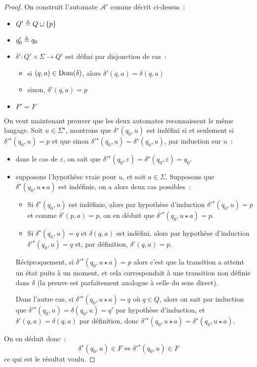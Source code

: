 \begin{proof}
  On construit l'automate $\mathcal A'$ comme décrit ci-dessus~:
  \begin{itemize}
  \item $Q' \triangleq Q \sqcup \{p\}$
  \item $q'_0 \triangleq q_0$
  \item $\delta' : Q' \times \Sigma \to Q'$ est défini par disjonction de cas~:
    \begin{itemize}
    \item si $(q,a) \in \operatorname{Dom}(\delta)$, alors $\delta'(q,a) = \delta(q,a)$
    \item sinon, $\delta'(q,a) = p$
    \end{itemize}
  \item $F' = F$
  \end{itemize}

  On veut maintenant prouver que les deux automates reconnaissent le même
  langage. Soit $u \in \Sigma^\star$, montrons que $\delta^\star(q_0,u)$ est
  indéfini si et seulement si $\delta'^\star(q_0,u) = p$ et que sinon
  $\delta'^\star(q_0,u) = \delta^\star(q_0,u)$, par induction sur $u$~:
  \begin{itemize}
  \item dans le cas de $\varepsilon$, on sait que
    $\delta'^\star(q_0,\varepsilon) = \delta^\star(q_0,\varepsilon) = q_0$.
  \item supposons l'hypothèse vraie pour $u$, et soit $a \in \Sigma$. Supposons
    que $\delta^\star(q_0,u\star a)$ est indéfinie, on a alors deux cas
    possibles~:
    \begin{itemize}
    \item Si $\delta^\star(q_0,u)$ est indéfinie, alors par hypothèse
      d'induction $\delta'^\star(q_0,u) = p$ et comme $\delta'(p,a) = p$, on en
      déduit que $\delta'^\star(q_0,u\star a) = p$.
    \item Si $\delta^\star(q_0,u) = q$ et $\delta(q,a)$ est indéfini, alors
      par hypothèse d'induction $\delta'^\star(q_0,u) = q$ et, par définition,
      $\delta'(q,a) = p$.
    \end{itemize}
    
    Réciproquement, si $\delta'^\star(q_0,u\star a) = p$ alors c'est que la
    transition a atteint un état puits à un moment, et cela correspondait à
    une transition non définie dans $\delta$ (la preuve est parfaitement
    analogue à celle du sens direct).

    Dans l'autre cas, si $\delta'^\star(q_0,u\star a) = q$ où $q \in Q$, alors
    on sait par induction que $\delta'^\star(q_0,u) = \delta(q_0,u) = q'$ par
    hypothèse d'induction, et $\delta'(q,a) = \delta(q,a)$ par définition,
    donc $\delta'^\star(q_0,u\star a) = \delta^\star(q_0,u\star a)$.
  \end{itemize}

  On en déduit donc~:
  \[\delta^\star(q_0,u) \in F \iff \delta'^\star(q_0,u)\in F\]
  ce qui est le résultat voulu.
\end{proof}

